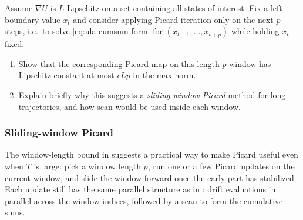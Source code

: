 \documentclass[11pt]{article}
\newif\ifshowsolutions
\newcommand{\SolutionBox}[2][10]{%
  \ifshowsolutions
    \begin{tcolorbox}[stat221panelgray,title={Solution}]
    #2
    \end{tcolorbox}
  \else
    \begin{tcolorbox}[stat221panelgray,unbreakable,title={Workspace}]
    \vspace{#1\baselineskip}
    \end{tcolorbox}
  \fi
}
\begin{document}
\begin{exercise}
\label{ex:picard-window}
Assume $\nabla U$ is $L$-Lipschitz on a set containing all states of interest.
Fix a left boundary value $x_t$ and consider applying Picard iteration only on the next $p$ steps,
i.e.\ to solve \eqref{eq:ula-cumsum-form} for $(x_{t+1},\dots,x_{t+p})$ while holding $x_t$ fixed.
\begin{enumerate}[leftmargin=*]
  \item Show that the corresponding Picard map on this length-$p$ window has Lipschitz constant at most $\epsilon L p$ in the max norm.
  \item Explain briefly why this suggests a \emph{sliding-window Picard} method for long trajectories, and how scan would be used inside each window.
\end{enumerate}
\end{exercise}
\SolutionBox[14]{%
\begin{enumerate}[leftmargin=*]
  \item The windowed Picard map is the same as in \Cref{prop:picard-contraction}, but the sums run only over the next $p$ steps.
  Repeating the bound in the proof of \Cref{prop:picard-contraction} with $t\le p$ gives
  \[
  \max_{j\in\{1,\dots,p\}} \norm{\mathcal{P}_{\mathrm{win}}(x)_{t+j}-\mathcal{P}_{\mathrm{win}}(y)_{t+j}}_2
  \le \epsilon L p \max_{j\in\{0,\dots,p-1\}} \norm{x_{t+j}-y_{t+j}}_2,
  \]
  where $x_t=y_t$ is fixed.
  \item If $\epsilon L T$ is not small, global Picard may fail to contract over the whole horizon, but the same dynamics can be contracting over shorter horizons.
  A sliding-window method tries to exploit this by repeatedly running Picard updates on a window of length $p$ and then shifting the window forward once the early part has stabilized.
  Inside each window, one Picard update still consists of (i) evaluating increments $g_s(x_{s-1})$ in parallel over the window indices, and (ii) integrating them via a prefix sum, i.e.\ a scan.%
\end{enumerate}
}

\subsubsection{Sliding-window Picard}
\label{subsubsec:picard-window}

The window-length bound in  suggests a practical way to make Picard useful even when $T$ is large: pick a window length $p$, run one or a few Picard updates on the current window, and slide the window forward once the early part has stabilized.
Each update still has the same parallel structure as in : drift evaluations in parallel across the window indices, followed by a scan to form the cumulative sums.
\end{document}
